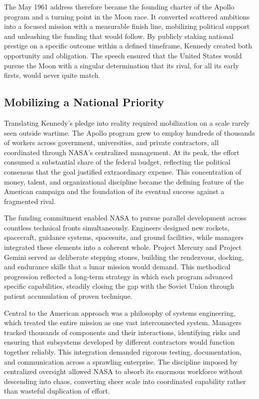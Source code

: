 The May 1961 address therefore became the founding charter of the Apollo program and a turning point in the Moon race. It converted scattered ambitions into a focused mission with a measurable finish line, mobilizing political support and unleashing the funding that would follow. By publicly staking national prestige on a specific outcome within a defined timeframe, Kennedy created both opportunity and obligation. The speech ensured that the United States would pursue the Moon with a singular determination that its rival, for all its early firsts, would never quite match. \cite{logsdon2010} \cite{chaikin1994}

\subsection{Mobilizing a National Priority}
Translating Kennedy's pledge into reality required mobilization on a scale rarely seen outside wartime. The Apollo program grew to employ hundreds of thousands of workers across government, universities, and private contractors, all coordinated through NASA's centralized management. At its peak, the effort consumed a substantial share of the federal budget, reflecting the political consensus that the goal justified extraordinary expense. This concentration of money, talent, and organizational discipline became the defining feature of the American campaign and the foundation of its eventual success against a fragmented rival.

The funding commitment enabled NASA to pursue parallel development across countless technical fronts simultaneously. Engineers designed new rockets, spacecraft, guidance systems, spacesuits, and ground facilities, while managers integrated these elements into a coherent whole. Project Mercury and Project Gemini served as deliberate stepping stones, building the rendezvous, docking, and endurance skills that a lunar mission would demand. This methodical progression reflected a long-term strategy in which each program advanced specific capabilities, steadily closing the gap with the Soviet Union through patient accumulation of proven technique.

Central to the American approach was a philosophy of systems engineering, which treated the entire mission as one vast interconnected system. Managers tracked thousands of components and their interactions, identifying risks and ensuring that subsystems developed by different contractors would function together reliably. This integration demanded rigorous testing, documentation, and communication across a sprawling enterprise. The discipline imposed by centralized oversight allowed NASA to absorb its enormous workforce without descending into chaos, converting sheer scale into coordinated capability rather than wasteful duplication of effort.

